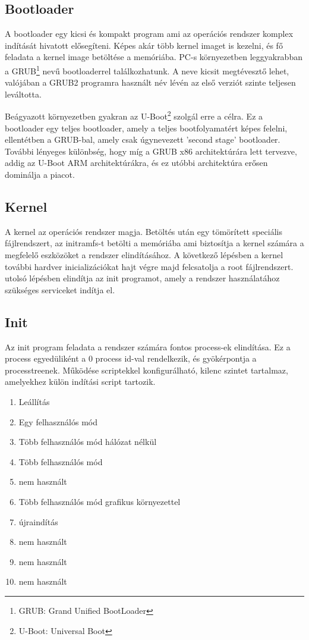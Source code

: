 \subsection{Bootloader}

A bootloader egy kicsi és kompakt program ami az operációs rendszer komplex
indítását hivatott elősegíteni. Képes akár több kernel imaget is kezelni, és fő
feladata a kernel image betöltése a memóriába. PC-s környezetben leggyakrabban a
GRUB\footnote{GRUB: Grand Unified BootLoader} nevű bootloaderrel
találkozhatunk. A neve kicsit megtévesztő lehet, valójában a GRUB2 programra
használt név lévén az első verziót szinte teljesen leváltotta.

Beágyazott környezetben gyakran az U-Boot\footnote{U-Boot: Universal Boot}
szolgál erre a célra. Ez a bootloader egy teljes bootloader, amely a teljes
bootfolyamatért képes felelni, ellentétben a GRUB-bal, amely csak úgynevezett
'second stage' bootloader. További lényeges különbség, hogy míg a GRUB x86
architektúrára lett tervezve, addig az U-Boot ARM architektúrákra, és ez utóbbi
architektúra erősen dominálja a piacot.

\subsection{Kernel}

A kernel az operációs rendszer magja. Betöltés után egy tömörített speciális
fájlrendszert, az initramfs-t betölti a memóriába ami biztosítja a kernel számára
a megfelelő eszközöket a rendszer elindításához. A következő lépésben a kernel
további hardver inicializációkat hajt végre majd felcsatolja a root
fájlrendszert. utolsó lépésben elindítja az init programot, amely a rendszer
használatához szükséges serviceket indítja el.

\subsection{Init}

Az init program feladata a rendszer számára fontos process-ek elindítása. Ez a
process egyedüliként a 0 process id-val rendelkezik, és gyökérpontja a
processtreenek. Működése scriptekkel konfigurálható, kilenc szintet tartalmaz,
amelyekhez külön indítási script tartozik.

\begin{enumerate}
  \item Leállítás
  \item Egy felhasználós mód
  \item Több felhasználós mód hálózat nélkül
  \item Több felhasználós mód
  \item nem használt
  \item Több felhasználós mód grafikus környezettel
  \item újraindítás
  \item nem használt
  \item nem használt
  \item nem használt
\end{enumerate}

